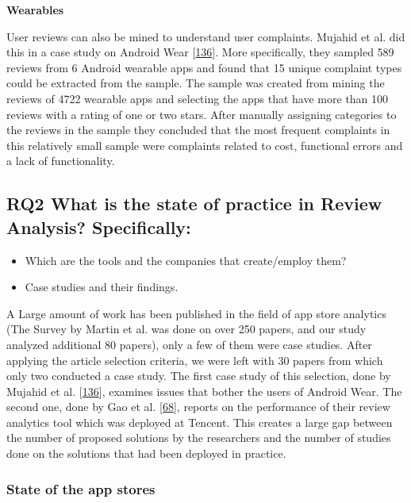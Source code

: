 \documentclass[]{book}
\providecommand{\tightlist}{%
  \setlength{\itemsep}{0pt}\setlength{\parskip}{0pt}}
\begin{document}
\textbf{Wearables}

User reviews can also be mined to understand user complaints. Mujahid et
al. did this in a case study on Android Wear
{[}\protect\hyperlink{ref-mujahid2017examining}{136}{]}. More
specifically, they sampled 589 reviews from 6 Android wearable apps and
found that 15 unique complaint types could be extracted from the sample.
The sample was created from mining the reviews of 4722 wearable apps and
selecting the apps that have more than 100 reviews with a rating of one
or two stars. After manually assigning categories to the reviews in the
sample they concluded that the most frequent complaints in this
relatively small sample were complaints related to cost, functional
errors and a lack of functionality.

\subsection{\texorpdfstring{\textbf{RQ2} What is the state of practice
in Review Analysis?
Specifically:}{RQ2 What is the state of practice in Review Analysis? Specifically:}}\label{rq2-what-is-the-state-of-practice-in-review-analysis-specifically}

\begin{itemize}
\tightlist
\item
  Which are the tools and the companies that create/employ them?
\item
  Case studies and their findings.
\end{itemize}

A Large amount of work has been published in the field of app store
analytics (The Survey by Martin et al. was done on over 250 papers, and
our study analyzed additional 80 papers), only a few of them were case
studies. After applying the article selection criteria, we were left
with 30 papers from which only two conducted a case study. The first
case study of this selection, done by Mujahid et al.
{[}\protect\hyperlink{ref-mujahid2017examining}{136}{]}, examines issues
that bother the users of Android Wear. The second one, done by Gao et
al. {[}\protect\hyperlink{ref-gao2018online}{68}{]}, reports on the
performance of their review analytics tool which was deployed at
Tencent. This creates a large gap between the number of proposed
solutions by the researchers and the number of studies done on the
solutions that had been deployed in practice.

\subsubsection{State of the app stores}\label{state-of-the-app-stores}
\end{document}
